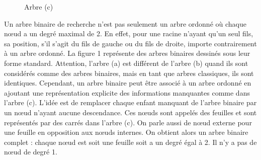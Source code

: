\documentclass{report}
\begin{document}
\begin{figure}
\begin{center}
\end{center}
\caption{Arbre (c)} \label{fig:Exemples d'arbres}
\end{figure}

Un arbre binaire de recherche n'est pas seulement un arbre ordonné où chaque nœud a un degré maximal de 2.  En effet, pour une racine n'ayant qu'un seul fils, sa position, s'il s'agit du fils de gauche ou du fils de droite, importe contrairement à un arbre ordonné.
La figure 1 représente des arbres binaires dessinés sous leur forme standard. Attention, l'arbre (a) est différent de l'arbre (b) quand ils sont considérés comme des arbres binaires, mais en tant que arbres classiques, ils sont identiques.
Cependant, un arbre binaire peut être associé à un arbre ordonné en ajoutant une représentation explicite des informations manquantes comme dans l'arbre (c). L'idée est de remplacer chaque enfant manquant de l'arbre binaire par un nœud n'ayant aucune descendance. Ces nœuds sont appelés des feuilles et sont représentés par des carrés dans l'arbre (c). On parle aussi de nœud externe pour une feuille en opposition aux nœuds internes. On obtient alors un arbre binaire complet : chaque nœud est soit une feuille soit a un degré égal à 2. Il n'y a pas de nœud de degré 1.
\end{document}
